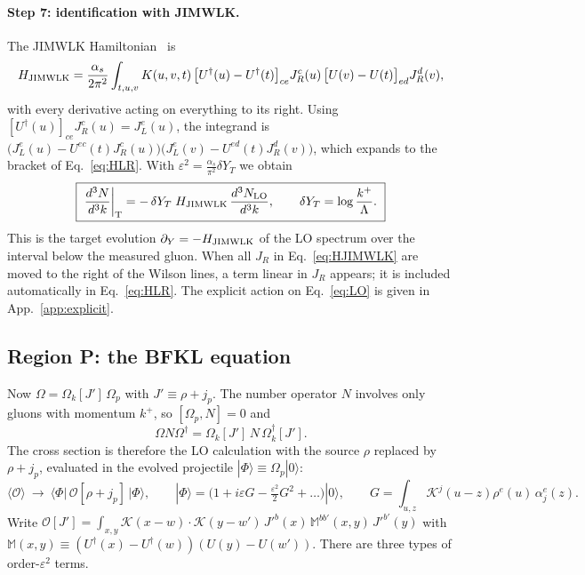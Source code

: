 \documentclass[aps,prd,onecolumn,superscriptaddress,nofootinbib,floatfix,longbibliography,11pt]{revtex4-2}
\numberwithin{equation}{section}
\newcommand{\KK}{\mathcal{K}}
\newcommand{\Ud}{U^{\dagger}}
\newcommand{\Ord}{\mathcal{O}}
\begin{document}
\paragraph*{Step 7: identification with JIMWLK.} The JIMWLK Hamiltonian~\cite{JalilianMarian:1997jx,JalilianMarian:1997gr,JalilianMarian:1998cb,Kovner:2000pt,Weigert:2000gi,Iancu:2000hn,Ferreiro:2001qy} is
\begin{equation}
H_{\rm JIMWLK}=\frac{\alpha_s}{2\pi^2}\int_{t,u,v}K(u,v,t)\,\big[\Ud(u)-\Ud(t)\big]_{ce}J_R^c(u)\,\big[U(v)-U(t)\big]_{ed}J_R^d(v),
\label{eq:HJIMWLK}
\end{equation}
with every derivative acting on everything to its right. Using $[\Ud(u)]_{ce}J_R^c(u)=J_L^e(u)$, the integrand is $\big(J_L^e(u)-U^{ec}(t)J_R^c(u)\big)\big(J_L^e(v)-U^{ed}(t)J_R^d(v)\big)$, which expands to the bracket of Eq.~\eqref{eq:HLR}. With $\varepsilon^2=\frac{\alpha_s}{\pi^2}\delta Y_T$ we obtain
\begin{equation}
\boxed{\ \frac{d^3N}{d^3k}\bigg|_{\rm T}=-\,\delta Y_T\;H_{\rm JIMWLK}\,\frac{d^3N_{\rm LO}}{d^3k},\qquad \delta Y_T=\log\frac{k^+}{\Lambda}.\ }
\label{eq:Tresult}
\end{equation}
This is the target evolution $\partial_Y=-H_{\rm JIMWLK}$ of the LO spectrum over the interval below the measured gluon. When all $J_R$ in Eq.~\eqref{eq:HJIMWLK} are moved to the right of the Wilson lines, a term linear in $J_R$ appears; it is included automatically in Eq.~\eqref{eq:HLR}. The explicit action on Eq.~\eqref{eq:LO} is given in App.~\ref{app:explicit}.

\subsection{Region P: the BFKL equation}\label{sec:P}

Now $\Omega=\Omega_k[J']\,\Omega_p$ with $J'\equiv\rho+j_p$. The number operator $N$ involves only gluons with momentum $k^+$, so $[\Omega_p,N]=0$ and
\begin{equation}
\Omega N\Omega^\dagger=\Omega_k[J']\,N\,\Omega_k^\dagger[J'].
\end{equation}
The cross section is therefore the LO calculation with the source $\rho$ replaced by $\rho+j_p$, evaluated in the evolved projectile $|\Phi\rangle\equiv\Omega_p|0\rangle$:
\begin{equation}
\langle\Ord\rangle\ \longrightarrow\ \big\langle\Phi\big|\,\Ord[\rho+j_p]\,\big|\Phi\big\rangle,\qquad|\Phi\rangle=\Big(1+i\varepsilon G-\tfrac{\varepsilon^2}{2}G^2+\dots\Big)|0\rangle,\qquad G=\int_{u,z}\KK^j(u-z)\rho^e(u)\,\alpha^e_j(z).
\end{equation}
Write $\Ord[J']=\int_{x,y}\KK(x-w)\cdot\KK(y-w')\,J'^b(x)\,\mathbb M^{bb'}(x,y)\,J'^{b'}(y)$ with $\mathbb M(x,y)\equiv(\Ud(x)-\Ud(w))(U(y)-U(w'))$. There are three types of order-$\varepsilon^2$ terms.
\end{document}
